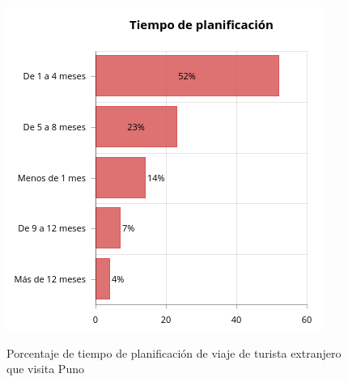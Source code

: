 \begin{figure}[!ht]
    \centering
    \includegraphics[scale=0.7]{Capitulo2/Figs/tiempo_planificacion_extranjero.jpg}
    \caption{Porcentaje de tiempo de planificación de viaje de turista extranjero que visita Puno}
    \cite{2017PerfilExtranjerob}
    \label{fig:tiempo_planificacion_extranjero}
\end{figure}

